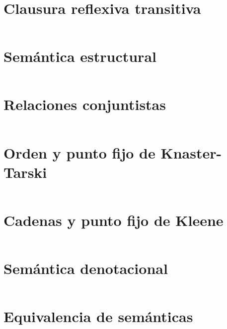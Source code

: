 \documentclass[
  a4paper, 
  10pt, 
  parskip=half, 
  toc=bibliography,
]{scrbook}
\theoremstyle{definition}
\theoremstyle{bolddef}
\begin{document}
\inputminted{lean4}{../SemanticsLean/Semantics/Imp/BigStep.lean}

\section{Clausura reflexiva transitiva}\label{sec:code_refltransgen}

\inputminted{lean4}{../SemanticsLean/Semantics/ReflTransRel.lean}

\section{Semántica estructural}

\inputminted{lean4}{../SemanticsLean/Semantics/Imp/SmallStep.lean}

\section{Relaciones conjuntistas}
\inputminted{lean4}{../SemanticsLean/Semantics/SetRelation.lean}

\section{Orden y punto fijo de Knaster-Tarski}

\inputminted{lean4}{../SemanticsLean/Semantics/Lattice.lean}

\section{Cadenas y punto fijo de Kleene}

\inputminted{lean4}{../SemanticsLean/Semantics/Chain.lean}

\section{Semántica denotacional}\label{sec:code_denotational}

\inputminted{lean4}{../SemanticsLean/Semantics/Imp/Denotational.lean}

\section{Equivalencia de semánticas}

\inputminted{lean4}{../SemanticsLean/Semantics/Imp/Equivalence.lean}
\end{document}
